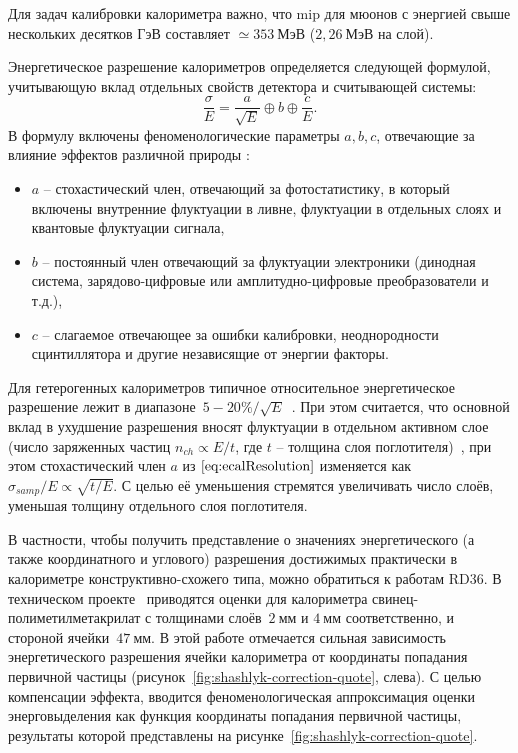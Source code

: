 Для задач калибровки калориметра важно, что \acrshort{mip} для
мюонов с энергией свыше нескольких десятков ГэВ
составляет $\simeq353~\text{МэВ}$ ($2{,}26~\text{МэВ}$ на слой).


Энергетическое разрешение калориметров определяется следующей
формулой, учитывающую вклад отдельных свойств детектора и считывающей системы:
\begin{equation}
    \frac{\sigma}{E} = \frac{a}{\sqrt{E}} \oplus b \oplus \frac{c}{E}.
    \label{eq:ecalResolution}
\end{equation}
В формулу включены феноменологические параметры $a, b, c$, отвечающие за
влияние эффектов различной природы \cite{CalorimetryPPhFabiola}:
\begin{itemize}
    \item $a$ -- стохастический член, отвечающий за фотостатистику,
    в который включены внутренние флуктуации в ливне, флуктуации
    в отдельных слоях и квантовые флуктуации сигнала,
    \item $b$ -- постоянный член отвечающий за флуктуации
    электроники (динодная система, зарядово-цифровые или
    амплитудно-цифровые преобразователи и т.д.),
    \item $c$ -- слагаемое отвечающее за ошибки калибровки,
    неоднородности сцинтиллятора и другие независящие от энергии
    факторы.
\end{itemize}

Для гетерогенных калориметров типичное относительное
энергетическое разрешение лежит в
диапазоне~$5-20\%/\sqrt{E}$~\cite{CalorimetryPPhFabiola}.
При этом считается, что основной вклад в
ухудшение разрешения вносят флуктуации в отдельном активном слое (число
заряженных частиц $n_{ch} \propto E/t$, где $t$ -- толщина слоя
поглотителя)~\cite{grupenDetectors2008, wigmansCalorimetry},
при этом стохастический член $a$ из $\eqref{eq:ecalResolution}$
изменяется как $\sigma_{samp}/E \propto \sqrt{t/E}$.
С целью её уменьшения стремятся увеличивать число слоёв,
уменьшая толщину отдельного слоя поглотителя.

В частности, чтобы получить представление о значениях энергетического
(а также координатного и углового) разрешения достижимых
практически в калориметре конструктивно-схожего типа, можно
обратиться к работам RD36. В техническом проекте~\cite{rd36-shashlik-1996}
приводятся оценки для калориметра свинец-полиметилметакрилат с
толщинами слоёв~$2~\text{мм}$ и $4~\text{мм}$ соответственно, и
стороной ячейки~$47~\text{мм}$. В этой работе отмечается сильная
зависимость энергетического разрешения ячейки калориметра от
координаты попадания первичной частицы
(рисунок~\ref{fig:shashlyk-correction-quote}, слева). С целью
компенсации эффекта,
вводится феноменологическая аппроксимация оценки энерговыделения
как функция координаты попадания первичной частицы, результаты которой
представлены на рисунке~\ref{fig:shashlyk-correction-quote}.

